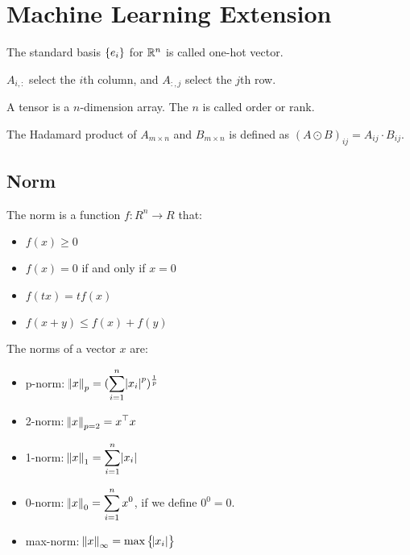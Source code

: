 \section{Machine Learning Extension}


The standard basis $\set{e_i}$ for $\mathbb{R}^n$ is called one-hot vector.

$A_{i,:}$ select the $i$th column, and $A_{:,j}$ select the $j$th row.

A tensor is a $n$-dimension array. The $n$ is called order or rank.


\begin{definition}
    The Hadamard product of $A_{m \times n}$ and $B_{m\times n}$ is defined as $(A \odot B)_{ij} = A_{ij} \cdot B_{ij}$.
\end{definition}

\subsection{Norm}

\begin{definition}[Norm]
    The norm is a function $f : R^n \rightarrow R$ that:
    \begin{itemize}
        \item $f(x) \geq 0$
        \item $f(x) = 0$ if and only if $x = 0$
        \item $f(tx) = t f(x)$
        \item $f(x+y) \leq f(x) + f(y)$
    \end{itemize}
\end{definition}

\begin{definition}
    The norms of a vector $x$ are:
\begin{itemize}
    \item p-norm: $\displaystyle \norm{x}_p = (\sum_{i=1}^n \abs{x_i}^p)^{\frac{1}{p}}$
    \item 2-norm: $\displaystyle \norm{x}_{p=2} = {x}^\top x$
    \item 1-norm: $\displaystyle \norm{x}_1 = \sum_{i=1}^n \abs{x_i}$
    \item 0-norm: $\displaystyle \norm{x}_0 = \sum_{i=1}^n x^0$, if we define $0^0 = 0$.
    \item max-norm: $\norm{x}_\infty = \max \set{\abs{x_i}}$
\end{itemize}
\end{definition}

